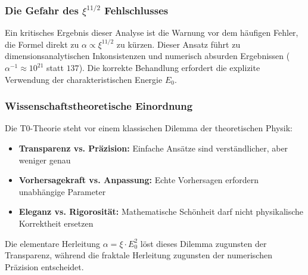 \documentclass[12pt,a4paper]{article}
\theoremstyle{definition}
\begin{document}
	
	\subsubsection{Die Gefahr des $\xi^{11/2}$ Fehlschlusses}
	
	Ein kritisches Ergebnis dieser Analyse ist die Warnung vor dem häufigen Fehler, die Formel direkt zu $\alpha \propto \xi^{11/2}$ zu kürzen. Dieser Ansatz führt zu dimensionsanalytischen Inkonsistenzen und numerisch absurden Ergebnissen ($\alpha^{-1} \approx 10^{21}$ statt $137$). Die korrekte Behandlung erfordert die explizite Verwendung der charakteristischen Energie $E_0$.
	
	\subsubsection{Wissenschaftstheoretische Einordnung}
	
	Die T0-Theorie steht vor einem klassischen Dilemma der theoretischen Physik:
	
	\begin{itemize}
		\item \textbf{Transparenz vs. Präzision:} Einfache Ansätze sind verständlicher, aber weniger genau
		\item \textbf{Vorhersagekraft vs. Anpassung:} Echte Vorhersagen erfordern unabhängige Parameter
		\item \textbf{Eleganz vs. Rigorosität:} Mathematische Schönheit darf nicht physikalische Korrektheit ersetzen
	\end{itemize}
	
	Die elementare Herleitung $\alpha = \xi \cdot E_0^2$ löst dieses Dilemma zugunsten der Transparenz, während die fraktale Herleitung zugunsten der numerischen Präzision entscheidet.
	
		
	
	
\end{document}
